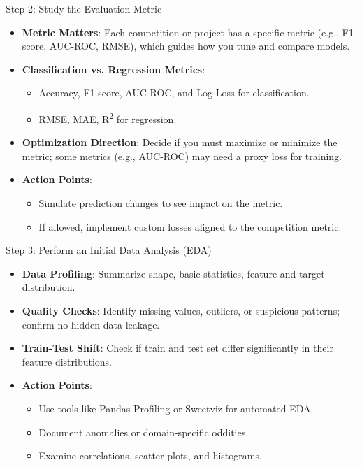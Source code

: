 \documentclass[ignorenonframetext,]{beamer}
\begin{document}
\begin{frame}{Step 2: Study the Evaluation Metric}
\begin{itemize}
  \item \textbf{Metric Matters}: Each competition or project has a specific metric (e.g., F1-score, AUC-ROC, RMSE), which guides how you tune and compare models.
  \item \textbf{Classification vs. Regression Metrics}:
    \begin{itemize}
      \item Accuracy, F1-score, AUC-ROC, and Log Loss for classification.
      \item RMSE, MAE, R\textsuperscript{2} for regression.
    \end{itemize}
  \item \textbf{Optimization Direction}: Decide if you must maximize or minimize the metric; some metrics (e.g., AUC-ROC) may need a proxy loss for training.
  \item \textbf{Action Points}:
    \begin{itemize}
      \item Simulate prediction changes to see impact on the metric.
      \item If allowed, implement custom losses aligned to the competition metric.
    \end{itemize}
\end{itemize}
\end{frame}

\begin{frame}{Step 3: Perform an Initial Data Analysis (EDA)}
\begin{itemize}
  \item \textbf{Data Profiling}: Summarize shape, basic statistics, feature and target distribution.
  \item \textbf{Quality Checks}: Identify missing values, outliers, or suspicious patterns; confirm no hidden data leakage.
  \item \textbf{Train-Test Shift}: Check if train and test set differ significantly in their feature distributions.
  \item \textbf{Action Points}:
    \begin{itemize}
      \item Use tools like Pandas Profiling or Sweetviz for automated EDA.
      \item Document anomalies or domain-specific oddities.
      \item Examine correlations, scatter plots, and histograms.
    \end{itemize}
\end{itemize}
\end{frame}
\end{document}
